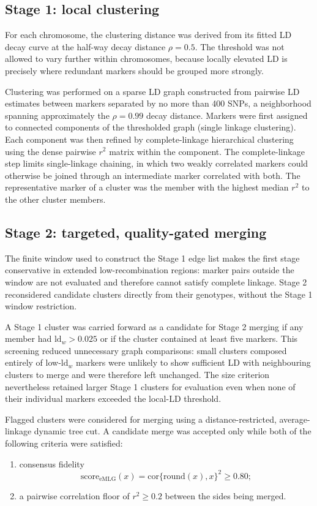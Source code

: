 \documentclass[11pt]{article}
\begin{document}
\subsection{Stage 1: local clustering}

For each chromosome, the clustering distance was derived from its fitted LD
decay curve at the half-way decay distance \(\rho=0.5\). The threshold was not allowed to vary further
within chromosomes, because locally elevated LD is precisely where redundant
markers should be grouped more strongly.

Clustering was performed on a sparse LD graph constructed from pairwise LD estimates between markers separated by no more than 400 SNPs, a neighborhood spanning approximately the $\rho=0.99$ decay distance. Markers were first
assigned to connected components of the thresholded graph (single linkage clustering). Each component was
then refined by complete-linkage hierarchical clustering using the dense
pairwise \(r^2\) matrix within the component. The complete-linkage step limits
single-linkage chaining, in which two weakly correlated markers could otherwise
be joined through an intermediate marker correlated with both. The representative marker of a cluster was the member with the highest median
\(r^2\) to the other cluster members.

\subsection{Stage 2: targeted, quality-gated merging}

The finite window used to construct the Stage 1 edge list makes the first stage
conservative in extended low-recombination regions: marker pairs outside the
window are not evaluated and therefore cannot satisfy complete linkage. Stage
2 reconsidered candidate clusters directly from their genotypes, without the
Stage 1 window restriction.

A Stage 1 cluster was carried forward as a candidate for Stage 2 merging if any member had \(\mathrm{ld}_w>0.025\) or if the cluster contained at least five markers. This screening reduced unnecessary graph comparisons: small clusters composed entirely of low-\(\mathrm{ld}_w\) markers were unlikely to show sufficient LD with neighbouring clusters to merge and were therefore left unchanged. The size criterion nevertheless retained larger Stage 1 clusters for evaluation even when none of their individual markers exceeded the local-LD threshold.

Flagged clusters were considered for merging using a distance-restricted,
average-linkage dynamic tree cut. A candidate merge was accepted only while
both of the following criteria were satisfied:
\begin{enumerate}
  \item consensus fidelity
  \[
    \mathrm{score}_{\mathrm{eMLG}}(x)
    =\mathrm{cor}\{\mathrm{round}(x),x\}^{2} \geq 0.80;
  \]
  \item a pairwise correlation floor of \(r^2\geq0.2\) between the sides being
        merged.
\end{enumerate}
\end{document}
